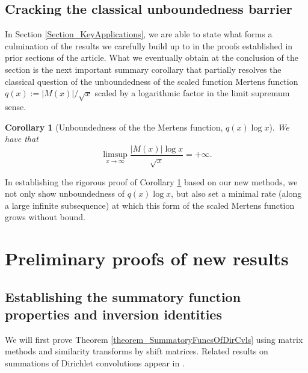 \documentclass[11pt,reqno,a4letter]{article}
\numberwithin{figure}{section}
\numberwithin{table}{section}
\newcommand{\cf}{\textit{cf.\ }}
\theoremstyle{plain}
\newtheorem{cor}[theorem]{Corollary}
\numberwithin{theorem}{section}
\theoremstyle{definition}
\begin{document}
\subsection{Cracking the classical unboundedness barrier} 

In Section \ref{Section_KeyApplications}, 
we are able to state what forms a culmination of the results 
we carefully build up to in the proofs established in prior sections of the article. 
What we eventually obtain at the conclusion of the section 
is the next important summary corollary that partially 
resolves the classical question of the 
unboundedness of the scaled function Mertens function 
$q(x) := |M(x)| / \sqrt{x}$ scaled by a logarithmic factor 
in the limit supremum sense. 

\begin{cor}[Unboundedness of the the Mertens function, $q(x) \log x$] 
\label{cor_ThePipeDreamResult_v1} 
We have that 
\[
\limsup_{x \rightarrow \infty} \frac{|M(x)| \log x}{\sqrt{x}} = +\infty. 
\]
\end{cor} 

In establishing the rigorous proof of 
Corollary \ref{cor_ThePipeDreamResult_v1} 
based on our new methods, we not only show unboundedness of 
$q(x) \log x$, but also set a minimal rate (along a large infinite subsequence) 
at which this form of the 
scaled Mertens function grows without bound. 

\newpage 
\section{Preliminary proofs of new results} 
\label{Section_PrelimProofs_Config} 

\subsection{Establishing the summatory function properties and inversion identities} 

We will first prove Theorem \ref{theorem_SummatoryFuncsOfDirCvls} 
using matrix methods and similarity transforms by shift matrices. 
Related results on summations of Dirichlet convolutions appear in 
\cite[\S 2.14; \S 3.10; \S 3.12; \cf \S 4.9, p.\ 95]{APOSTOLANUMT}. 
\end{document}
